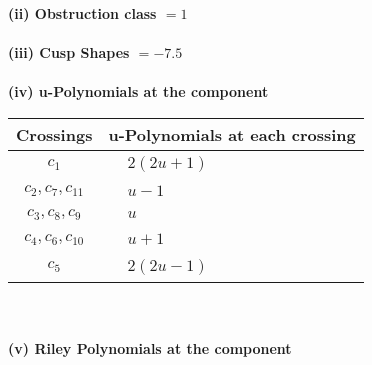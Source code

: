 \documentclass[1p]{elsarticle_modified}
\theoremstyle{definition}
\begin{document}
\flushleft \textbf{(ii) Obstruction class $= 1$}\\~\\
\flushleft \textbf{(iii) Cusp Shapes $= -7.5$}\\~\\
\newpage\renewcommand{\arraystretch}{1}
\flushleft \textbf{(iv) u-Polynomials at the component}\newline \\
\begin{tabular}{m{50pt}|m{274pt}}
Crossings & \hspace{64pt}u-Polynomials at each crossing \\
\hline $$\begin{aligned}c_{1}\end{aligned}$$&$\begin{aligned}
&2(2 u+1)
\end{aligned}$\\
\hline $$\begin{aligned}c_{2},c_{7},c_{11}\end{aligned}$$&$\begin{aligned}
&u-1
\end{aligned}$\\
\hline $$\begin{aligned}c_{3},c_{8},c_{9}\end{aligned}$$&$\begin{aligned}
&u
\end{aligned}$\\
\hline $$\begin{aligned}c_{4},c_{6},c_{10}\end{aligned}$$&$\begin{aligned}
&u+1
\end{aligned}$\\
\hline $$\begin{aligned}c_{5}\end{aligned}$$&$\begin{aligned}
&2(2 u-1)
\end{aligned}$\\
\hline
\end{tabular}\\~\\
\newpage\renewcommand{\arraystretch}{1}
\flushleft \textbf{(v) Riley Polynomials at the component}\newline \\
\end{document}
